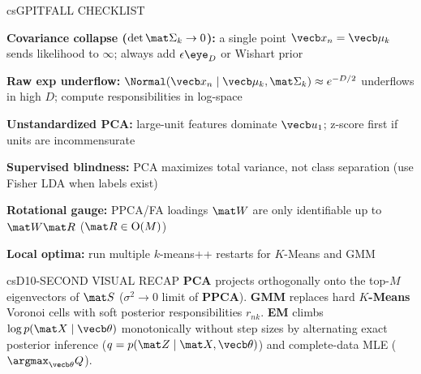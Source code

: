 \documentclass[../../../../master.tex]{subfiles}
\begin{document}
\begin{cscolumns}
\begin{cscard}{csG}{PITFALL CHECKLIST}
  \begin{csbul}
    \item \textbf{Covariance collapse ($\det\mat\Sigma_k\to 0$):} a single point $\vecb x_n=\vecb\mu_k$ sends likelihood to $\infty$; always add $\epsilon\eye_D$ or Wishart prior
    \item \textbf{Raw exp underflow:} $\Normal(\vecb x_n\mid\vecb\mu_k,\mat\Sigma_k)\approx e^{-D/2}$ underflows in high $D$; compute responsibilities in log-space
    \item \textbf{Unstandardized PCA:} large-unit features dominate $\vecb u_1$; z-score first if units are incommensurate
    \item \textbf{Supervised blindness:} PCA maximizes total variance, not class separation (use Fisher LDA when labels exist)
    \item \textbf{Rotational gauge:} PPCA/FA loadings $\mat W$ are only identifiable up to $\mat W\mat R$ ($\mat R\in\mathrm{O}(M)$)
    \item \textbf{Local optima:} run multiple $k$-means++ restarts for $K$-Means and GMM
  \end{csbul}
\end{cscard}

\begin{cscard}{csD}{10-SECOND VISUAL RECAP}
  \sffamily\footnotesize
  \textbf{PCA} projects orthogonally onto the top-$M$ eigenvectors of $\mat S$ ($\sigma^2\to 0$ limit of \textbf{PPCA}).
  \textbf{GMM} replaces hard \textbf{$K$-Means} Voronoi cells with soft posterior responsibilities $r_{nk}$.
  \textbf{EM} climbs $\log p(\mat X\mid\vecb\theta)$ monotonically without step sizes by alternating exact posterior inference ($q=p(\mat Z\mid\mat X,\vecb\theta)$) and complete-data MLE ($\argmax_{\vecb\theta} Q$).
\end{cscard}
\end{cscolumns}

\csend
\end{document}
